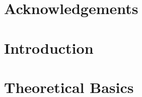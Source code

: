 \documentclass{scrbook}
\begin{document}
  
\maketitle

\frontmatter

\chapter{Acknowledgements}
\label{ch:ack}


\tableofcontents

\mainmatter

\chapter{Introduction}
\label{ch:intro}


\chapter{Theoretical Basics}
\label{ch:basics}


\backmatter

\printbibliography
{}
\end{document}
